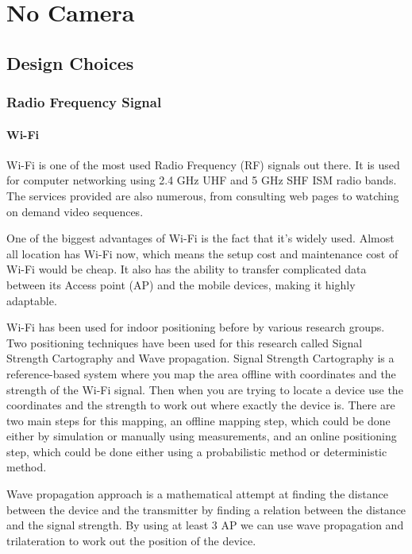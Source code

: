 \chapter{No Camera}

\label{ch:no_camera}

\section{Design Choices}

\subsection{Radio Frequency Signal}

\subsubsection{Wi-Fi}

Wi-Fi is one of the most used Radio Frequency (RF) signals out there.
It is used for computer networking using 2.4 GHz UHF and 5 GHz SHF
ISM radio bands\cite{wifi-wikipedia}. The services provided are also
numerous, from consulting web pages to watching on demand video sequences. 

One of the biggest advantages of Wi-Fi is the fact that it\textquoteright s
widely used. Almost all location has Wi-Fi now, which means the setup
cost and maintenance cost of Wi-Fi would be cheap. It also has the
ability to transfer complicated data between its Access point (AP)
and the mobile devices, making it highly adaptable. 

Wi-Fi has been used for indoor positioning before by various research
groups. Two positioning techniques have been used for this research
called Signal Strength Cartography and Wave propagation. Signal Strength
Cartography is a reference-based system where you map the area offline
with coordinates and the strength of the Wi-Fi signal. Then when you
are trying to locate a device use the coordinates and the strength
to work out where exactly the device is. There are two main steps
for this mapping, an offline mapping step, which could be done either
by simulation or manually using measurements, and an online positioning
step, which could be done either using a probabilistic method or deterministic
method. 

Wave propagation approach is a mathematical attempt at finding the
distance between the device and the transmitter by finding a relation
between the distance and the signal strength. By using at least 3
AP we can use wave propagation and trilateration to work out the position
of the device. 

